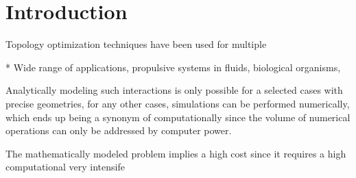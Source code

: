 \documentclass[twoside,11pt]{../Latex/Classes/PhDthesisPSnPDF_jacob}
\begin{document}
			
	\mainmatter				

    		\graphicspath{{figures/PNG/}{figures/PDF/}{figures/}}		
%																
\else%
	\graphicspath{{1_introduction/figures/PNG/}{1_introduction/figures/PDF/}{1_introduction/figures/}}							
\fi%
%															
%															





\chapter{Introduction}


Topology optimization techniques have been used for multiple 



* Wide range of applications, propulsive systems in fluids,   biological organisms, 



Analytically modeling such interactions is only possible for a selected cases with precise geometries, for any other cases,
simulations can be performed numerically, which ends up being a synonym of computationally since the volume of numerical operations can only be addressed by computer power.

The mathematically modeled problem implies a high cost since it requires a high computational very intensife
\end{document}
